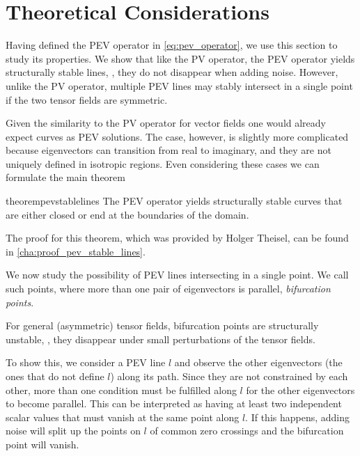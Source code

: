 \section{Theoretical Considerations} %
\label{sec:pev_theory}
%
Having defined the \ac{PEV} operator in \cref{eq:pev_operator}, we use this
section to study its properties.
%
We show that like the \ac{PV} operator, the \ac{PEV} operator yields
structurally stable lines, \ie, they do not disappear when adding noise.
%
However, unlike the \ac{PV} operator, multiple \ac{PEV} lines may stably
intersect in a single point if the two tensor fields are symmetric.
% 

%
Given the similarity to the \ac{PV} operator for vector fields one would
already expect curves as \ac{PEV} solutions.
%
The case, however, is slightly more complicated because eigenvectors can
transition from real to imaginary, and they are not uniquely defined in
isotropic regions.
%
Even considering these cases we can formulate the main theorem
%
\begin{restatable}{theorem}{pevstablelines}
    \label{thm:pev_stable_lines}%
    The \ac{PEV} operator yields structurally stable curves that are either
    closed or end at the boundaries of the domain.
\end{restatable}
%
The proof for this theorem, which was provided by Holger Theisel, can be found
in \cref{cha:proof_pev_stable_lines}.
%

%
We now study the possibility of \ac{PEV} lines intersecting in a single point.
%
We call such points, where more than one pair of eigenvectors is parallel,
\emph{bifurcation points}.
%
\begin{theorem}\label{pev_bifurcation_unstable}
    For general (asymmetric) tensor fields, bifurcation points are structurally
    unstable, \ie, they disappear under small perturbations of the tensor
    fields.
\end{theorem}
%
To show this, we consider a \ac{PEV} line $l$ and observe the other eigenvectors
(the ones that do not define $l$) along its path.
%
Since they are not constrained by each other, more than one condition must be
fulfilled along $l$ for the other eigenvectors to become parallel.
%
This can be interpreted as having at least two independent scalar values that
must vanish at the same point along $l$.
%
If this happens, adding noise will split up the points on $l$ of common zero
crossings and the bifurcation point will vanish.
%

